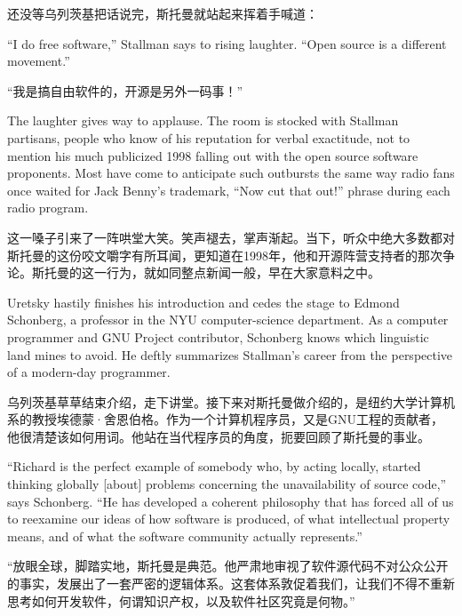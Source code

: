\ifdefined\chs
还没等乌列茨基把话说完，斯托曼就站起来挥着手喊道：
\fi

\ifdefined\eng
``I do free software,'' Stallman says to rising laughter. ``Open source is a different movement.''
\fi

\ifdefined\chs
``我是搞自由软件的，开源是另外一码事！''
\fi

\ifdefined\eng
The laughter gives way to applause. The room is stocked with Stallman partisans, people who know of his reputation for verbal exactitude, not to mention his much publicized 1998 falling out with the open source software proponents. Most have come to anticipate such outbursts the same way radio fans once waited for Jack Benny's trademark, ``Now cut that out!'' phrase during each radio program.
\fi

\ifdefined\chs
这一嗓子引来了一阵哄堂大笑。笑声褪去，掌声渐起。当下，听众中绝大多数都对斯托曼的这份咬文嚼字有所耳闻，更知道在1998年，他和开源阵营支持者的那次争论。斯托曼的这一行为，就如同整点新闻一般，早在大家意料之中。
\fi

\ifdefined\eng
Uretsky hastily finishes his introduction and cedes the stage to Edmond Schonberg, a professor in the NYU computer-science department. As a computer programmer and GNU Project contributor, Schonberg knows which linguistic land mines to avoid. He deftly summarizes Stallman's career from the perspective of a modern-day programmer.
\fi

\ifdefined\chs
乌列茨基草草结束介绍，走下讲堂。接下来对斯托曼做介绍的，是纽约大学计算机系的教授埃德蒙·舍恩伯格。作为一个计算机程序员，又是GNU工程的贡献者，他很清楚该如何用词。他站在当代程序员的角度，扼要回顾了斯托曼的事业。
\fi

\ifdefined\eng
``Richard is the perfect example of somebody who, by acting locally, started thinking globally [about] problems concerning the unavailability of source code,'' says Schonberg. ``He has developed a coherent philosophy that has forced all of us to reexamine our ideas of how software is produced, of what intellectual property means, and of what the software community actually represents.''\ifdefined\vtwo{}\fi
\fi

\ifdefined\chs
``放眼全球，脚踏实地，斯托曼是典范。他严肃地审视了软件源代码不对公众公开的事实，发展出了一套严密的逻辑体系。这套体系敦促着我们，让我们不得不重新思考如何开发软件，何谓知识产权，以及软件社区究竟是何物。''\ifdefined\vtwo{}\fi
\fi

